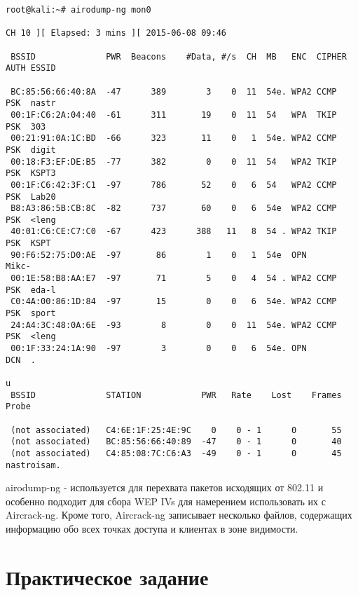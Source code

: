 \documentclass[utf8x, 12pt]{G7-32}
\begin{document}
\begin{lstlisting}
root@kali:~# airodump-ng mon0

CH 10 ][ Elapsed: 3 mins ][ 2015-06-08 09:46                                  
                                                                               
 BSSID              PWR  Beacons    #Data, #/s  CH  MB   ENC  CIPHER AUTH ESSID
                                                                               
 BC:85:56:66:40:8A  -47      389        3    0  11  54e. WPA2 CCMP   PSK  nastr
 00:1F:C6:2A:04:40  -61      311       19    0  11  54   WPA  TKIP   PSK  303  
 00:21:91:0A:1C:BD  -66      323       11    0   1  54e. WPA2 CCMP   PSK  digit
 00:18:F3:EF:DE:B5  -77      382        0    0  11  54   WPA2 TKIP   PSK  KSPT3
 00:1F:C6:42:3F:C1  -97      786       52    0   6  54   WPA2 CCMP   PSK  Lab20
 B8:A3:86:5B:CB:8C  -82      737       60    0   6  54e  WPA2 CCMP   PSK  <leng
 40:01:C6:CE:C7:C0  -67      423      388   11   8  54 . WPA2 TKIP   PSK  KSPT  
 90:F6:52:75:D0:AE  -97       86        1    0   1  54e  OPN              Mikc- 
 00:1E:58:B8:AA:E7  -97       71        5    0   4  54 . WPA2 CCMP   PSK  eda-l 
 C0:4A:00:86:1D:84  -97       15        0    0   6  54e. WPA2 CCMP   PSK  sport
 24:A4:3C:48:0A:6E  -93        8        0    0  11  54e. WPA2 CCMP   PSK  <leng 
 00:1F:33:24:1A:90  -97        3        0    0   6  54e. OPN              DCN  .
                                                                               u
 BSSID              STATION            PWR   Rate    Lost    Frames  Probe      
                                                                                
 (not associated)   C4:6E:1F:25:4E:9C    0    0 - 1      0       55             
 (not associated)   BC:85:56:66:40:89  -47    0 - 1      0       40             
 (not associated)   C4:85:08:7C:C6:A3  -49    0 - 1      0       45  nastroisam.
\end{lstlisting}


airodump-ng - используется для перехвата пакетов исходящих от 802.11 и особенно подходит для сбора WEP IVs для намерением использовать их с Aircrack-ng.
Кроме того, Aircrack-ng записывает несколько файлов, содержащих информацию обо всех точках доступа и клиентах в зоне видимости.


\newpage
\section{Практическое задание}
\end{document}
